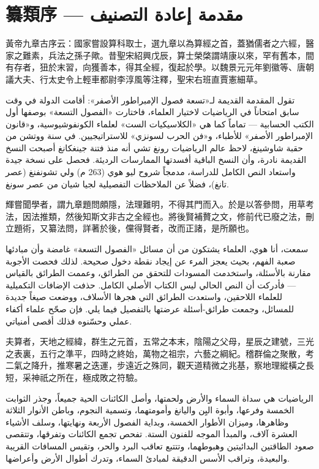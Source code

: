 \documentclass[11pt,a4paper]{article}
\newcommand{\ar}[1]{\arabicfont\beginR #1\endR}
\newcommand{\ChinCol}[1]{\begin{minipage}[t]{0.48\textwidth}#1\end{minipage}}
\newcommand{\ArabCol}[1]{\begin{minipage}[t]{0.48\textwidth}\arabicfont\beginR #1\endR\end{minipage}}
\newcommand{\parallelsection}[2]{%
  \noindent\ChinCol{#1}\hfill\ArabCol{#2}\par\vspace{0.5cm}%
}
\begin{document}
\tableofcontents
\newpage

\section*{纂類序 --- \ar{مقدمة إعادة التصنيف}}

\parallelsection{%
黃帝九章古序云：國家嘗設算科取士，選九章以為算經之首，蓋猶儒者之六經，醫家之難素，兵法之孫子歟。昔聖宋紹興戊辰，算士榮棨謂靖康以來，罕有舊本，間有存者，狃於末習，向獲善本，得其全經，復起於學。以魏景元元年劉徽等、唐朝議大夫、行太史令上輕車都尉李淳風等注釋，聖宋右班直賈憲細草。
}{%
تقول المقدمة القديمة لـ«تسعة فصول الإمبراطور الأصفر»: أقامت الدولة في وقت سابق امتحاناً في الرياضيات لاختيار العلماء، فاختارت «الفصول التسعة» بوصفها أول الكتب الحسابية --- تماماً كما هي «الكلاسيكيات الست» لعلماء الكونفوشيوسية، و«قانون الإمبراطور الأصفر» للأطباء، و«فن الحرب لسونزي» للاستراتيجيين. في سنة ووتشن من حقبة شاوشينغ، لاحظ عالم الرياضيات رونغ تشي أنه منذ فتنة جينغكانغ أصبحت النسخ القديمة نادرة، وأن النسخ الباقية أفسدتها الممارسات الرديئة. فحصل على نسخة جيدة واستعاد النص الكامل للدراسة، مدمجاً شروح ليو هوي (263 م) ولي تشونفنغ (عصر تانغ)، فضلاً عن الملاحظات التفصيلية لجيا شيان من عصر سونغ.
}

\parallelsection{%
輝嘗聞學者，謂九章題問頗隱，法理難明，不得其門而入。於是以答參問，用草考法，因法推類，然後知斯文非古之全經也。將後賢補贅之文，修前代已廢之法，刪立題術，又纂法問，詳著於後，儻得賢者，改而正諸，是所願也。
}{%
سمعت، أنا هوي، العلماء يشتكون من أن مسائل «الفصول التسعة» غامضة وأن مبادئها صعبة الفهم، بحيث يعجز المرء عن إيجاد نقطة دخول صحيحة. لذلك فحصت الأجوبة مقارنة بالأسئلة، واستخدمت المسودات للتحقق من الطرائق، وعممت الطرائق بالقياس --- فأدركت أن النص الحالي ليس الكتاب الأصلي الكامل. حذفت الإضافات التكميلية للعلماء اللاحقين، واستعدت الطرائق التي هجرها الأسلاف، ووضعت صيغاً جديدة للمسائل، وجمعت طرائق-أسئلة عرضتها بالتفصيل فيما يلي. فإن صحّح علماء أكفاء عملي وحسّنوه فذلك أقصى أمنياتي.
}

\parallelsection{%
夫算者，天地之經緯，群生之元首，五常之本末，陰陽之父母，星辰之建號，三光之表裏，五行之準平，四時之終始，萬物之祖宗，六藝之綱紀。稽群倫之聚散，考二氣之降升，推寒暑之迭運，步遠近之殊同，觀天道精微之兆基，察地理縱橫之長短，采神祇之所在，極成敗之符驗。
}{%
الرياضيات هي سداة السماء والأرض ولحمتها، وأصل الكائنات الحية جميعاً، وجذر الثوابت الخمسة وفرعها، وأبوة اليِن واليانغ وأمومتهما، وتسمية النجوم، وباطن الأنوار الثلاثة وظاهرها، وميزان الأطوار الخمسة، وبداية الفصول الأربعة ونهايتها، وسلف الأشياء العشرة آلاف، والمبدأ الموجه للفنون الستة. تفحص تجمع الكائنات وتفرقها، وتتقصى صعود الطاقتين البدائيتين وهبوطهما، وتتتبع تعاقب البرد والحر، وتقيس المسافات القريبة والبعيدة، وتراقب الأسس الدقيقة لمبادئ السماء، وتدرك أطوال الأرض وأعراضها.
}
\end{document}
